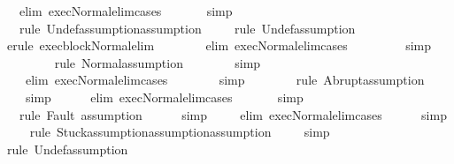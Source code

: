 \begin{isabellebody}
\ \ \ {\isacharparenleft}elim\ exec{\isacharunderscore}Normal{\isacharunderscore}elim{\isacharunderscore}cases{\isacharparenright}\isanewline
\ \ \isamarkupfalse%
\ \ \ \ simp\isanewline
\ \ \isamarkupfalse%
\ \ \ {\isacharparenleft}rule\ Undef{\isacharcomma}assumption{\isacharcomma}assumption{\isacharparenright}\isanewline
\ \ \isamarkupfalse%
\ \ {\isacharparenleft}rule\ Undef{\isacharcomma}assumption{\isacharplus}{\isacharparenright}\isanewline
\ \ \isamarkupfalse%
\ {\isacharparenleft}erule\ exec{\isacharunderscore}block{\isacharunderscore}Normal{\isacharunderscore}elim{\isacharparenright}\isanewline
\ \ \isamarkupfalse%
\ \ \ \ \ {\isacharparenleft}elim\ exec{\isacharunderscore}Normal{\isacharunderscore}elim{\isacharunderscore}cases{\isacharparenright}\isanewline
\ \ \isamarkupfalse%
\ \ \ \ \ \ simp\isanewline
\ \ \isamarkupfalse%
\ \ \ \ \ \ {\isacharparenleft}rule\ Normal{\isacharcomma}assumption{\isacharplus}{\isacharparenright}\isanewline
\ \ \isamarkupfalse%
\ \ \ \ \ simp\isanewline
\ \ \isamarkupfalse%
\ \ \ \ {\isacharparenleft}elim\ exec{\isacharunderscore}Normal{\isacharunderscore}elim{\isacharunderscore}cases{\isacharparenright}\isanewline
\ \ \isamarkupfalse%
\ \ \ \ \ simp\isanewline
\ \ \isamarkupfalse%
\ \ \ \ \ {\isacharparenleft}rule\ Abrupt{\isacharcomma}assumption{\isacharplus}{\isacharparenright}\isanewline
\ \ \isamarkupfalse%
\ \ \ \ simp\isanewline
\ \ \isamarkupfalse%
\ \ \ {\isacharparenleft}elim\ exec{\isacharunderscore}Normal{\isacharunderscore}elim{\isacharunderscore}cases{\isacharparenright}\isanewline
\ \ \isamarkupfalse%
\ \ \ \ simp\isanewline
\ \ \isamarkupfalse%
\ \ \ {\isacharparenleft}rule\ Fault{\isacharcomma}\ assumption{\isacharplus}{\isacharparenright}\isanewline
\ \ \isamarkupfalse%
\ \ \ simp\isanewline
\ \ \isamarkupfalse%
\ \ {\isacharparenleft}elim\ exec{\isacharunderscore}Normal{\isacharunderscore}elim{\isacharunderscore}cases{\isacharparenright}\isanewline
\ \ \isamarkupfalse%
\ \ \ simp\isanewline
\ \ \isamarkupfalse%
\ \ {\isacharparenleft}rule\ Stuck{\isacharcomma}assumption{\isacharcomma}assumption{\isacharcomma}assumption{\isacharparenright}\isanewline
\ \ \isamarkupfalse%
\ \ simp\isanewline
\ \ \isamarkupfalse%
\ {\isacharparenleft}rule\ Undef{\isacharcomma}assumption{\isacharplus}{\isacharparenright}\isanewline

\end{isabellebody}
